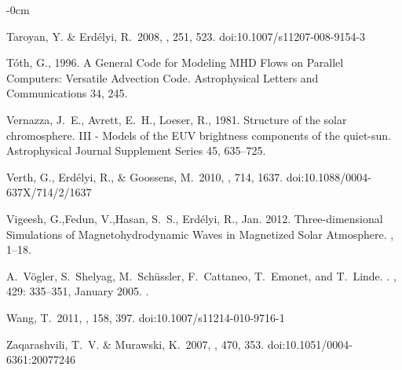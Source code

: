 \documentclass[physics,article,submit,pdftex,moreauthors]{Definitions/mdpi}
\begin{document}
\begin{adjustwidth}{-\extralength}{0cm}
\begin{thebibliography}{999}
 Taroyan, Y. \& Erd{\'e}lyi, R.\ 2008, \solphys, 251, 523. doi:10.1007/s11207-008-9154-3



{T{\'o}th}, G., 1996. {A General Code for Modeling {MHD} Flows on Parallel
  Computers: Versatile Advection Code}. Astrophysical Letters and
  Communications 34, 245.

{Vernazza}, J.~E., {Avrett}, E.~H., {Loeser}, R., 1981. {Structure of the solar
  chromosphere. III - Models of the EUV brightness components of the
  quiet-sun}. Astrophysical Journal Supplement Series 45, 635--725.
  
 Verth, G., Erd{\'e}lyi, R., \& Goossens, M.\ 2010, \apj, 714, 1637. doi:10.1088/0004-637X/714/2/1637

{Vigeesh}, G.,{Fedun}, V.,{Hasan}, S.~S., {Erd{\'e}lyi}, R.,  Jan. 2012. {Three-dimensional Simulations of Magnetohydrodynamic Waves in Magnetized Solar Atmosphere}. , 1--18.



A.~{V{\"o}gler}, S.~{Shelyag}, M.~{Sch{\"u}ssler}, F.~{Cattaneo}, T.~{Emonet},
  and T.~{Linde}.
.
\newblock \emph{\aap}, 429: 335--351, January 2005.
\newblock {}.

 Wang, T.\ 2011, \ssr, 158, 397. doi:10.1007/s11214-010-9716-1

 Zaqarashvili, T.~V. \& Murawski, K.\ 2007, \aap, 470, 353. doi:10.1051/0004-6361:20077246




\end{thebibliography}
\end{adjustwidth}
\end{document}

